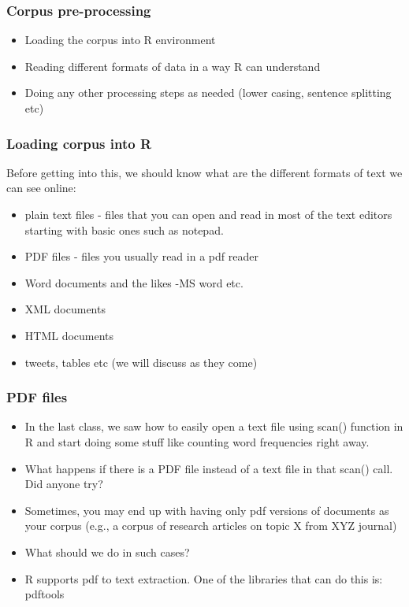 \documentclass{beamer}
\begin{document}
\begin{frame}
\frametitle{Corpus pre-processing}
\begin{itemize}
\item Loading the corpus into R environment
\item Reading different formats of data in a way R can understand
\item Doing any other processing steps as needed (lower casing, sentence splitting etc)
\end{itemize}
\end{frame}

\begin{frame}
\frametitle{Loading corpus into R}
Before getting into this, we should know what are the different formats of text we can see online:
\begin{itemize}
\item plain text files - files that you can open and read in most of the text editors starting with basic ones such as notepad. 
\item PDF files - files you usually read in a pdf reader
\item Word documents and the likes -MS word etc.
\item XML documents 
\item HTML documents
\item tweets, tables etc (we will discuss as they come)
\end{itemize}
\end{frame}

\begin{frame}
\frametitle{PDF files}
\begin{itemize}
\item In the last class, we saw how to easily open a text file using scan() function in R and start doing some stuff like counting word frequencies right away. 
\item What happens if there is a PDF file instead of a text file in that scan() call. Did anyone try? \pause
\item Sometimes, you may end up with having only pdf versions of documents as your corpus (e.g., a corpus of research articles on topic X from XYZ journal)
\item What should we do in such cases? \pause
\item R supports pdf to text extraction. One of the libraries that can do this is: pdftools
\end{itemize}
\end{frame}
\end{document}
